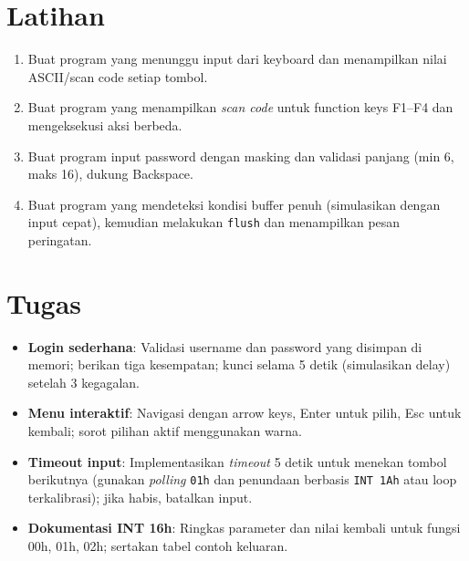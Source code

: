 \documentclass[../main.tex]{subfiles}
\begin{document}
\section{Latihan}
\begin{enumerate}
  \item Buat program yang menunggu input dari keyboard dan menampilkan nilai ASCII/scan code setiap tombol.
  \item Buat program yang menampilkan \textit{scan code} untuk function keys F1--F4 dan mengeksekusi aksi berbeda.
  \item Buat program input password dengan masking dan validasi panjang (min 6, maks 16), dukung Backspace.
  \item Buat program yang mendeteksi kondisi buffer penuh (simulasikan dengan input cepat), kemudian melakukan \texttt{flush} dan menampilkan pesan peringatan.
\end{enumerate}

\section{Tugas}
\begin{itemize}
  \item \textbf{Login sederhana}: Validasi username dan password yang disimpan di memori; berikan tiga kesempatan; kunci selama 5 detik (simulasikan delay) setelah 3 kegagalan.
  \item \textbf{Menu interaktif}: Navigasi dengan arrow keys, Enter untuk pilih, Esc untuk kembali; sorot pilihan aktif menggunakan warna.
  \item \textbf{Timeout input}: Implementasikan \textit{timeout} 5 detik untuk menekan tombol berikutnya (gunakan \textit{polling} \texttt{01h} dan penundaan berbasis \texttt{INT 1Ah} atau loop terkalibrasi); jika habis, batalkan input.
  \item \textbf{Dokumentasi INT 16h}: Ringkas parameter dan nilai kembali untuk fungsi 00h, 01h, 02h; sertakan tabel contoh keluaran.
\end{itemize}
\end{document}
